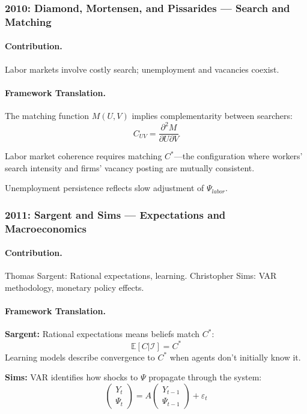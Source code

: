 \documentclass[12pt,a4paper]{article}
\begin{document}
\subsubsection{2010: Diamond, Mortensen, and Pissarides --- Search and Matching}

\paragraph{Contribution.}
Labor markets involve costly search; unemployment and vacancies coexist.

\paragraph{Framework Translation.}
The matching function $M(U, V)$ implies complementarity between searchers:
\begin{equation}
  C_{UV} = \frac{\partial^2 M}{\partial U \partial V}
\end{equation}

Labor market coherence requires matching $C^*$---the configuration where
workers' search intensity and firms' vacancy posting are mutually consistent.

Unemployment persistence reflects slow adjustment of $\Psi_{labor}$.

\subsubsection{2011: Sargent and Sims --- Expectations and Macroeconomics}

\paragraph{Contribution.}
Thomas Sargent: Rational expectations, learning.
Christopher Sims: VAR methodology, monetary policy effects.

\paragraph{Framework Translation.}
\textbf{Sargent:} Rational expectations means beliefs match $C^*$:
\begin{equation}
  \mathbb{E}[C | \mathcal{I}] = C^*
\end{equation}
Learning models describe convergence to $C^*$ when agents don't initially know it.

\textbf{Sims:} VAR identifies how shocks to $\Psi$ propagate through the system:
\begin{equation}
  \begin{pmatrix} Y_t \\ \Psi_t \end{pmatrix} = A \begin{pmatrix} Y_{t-1} \\ \Psi_{t-1} \end{pmatrix} + \varepsilon_t
\end{equation}
\end{document}
